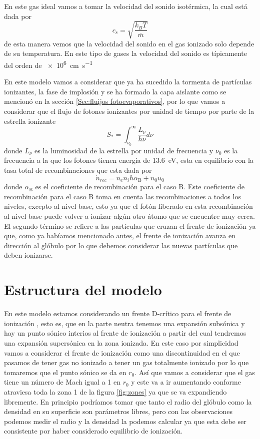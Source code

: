 \documentclass{book}
\begin{document}
En este gas ideal vamos a tomar la velocidad del sonido isotérmica, la cual está dada por
\[c_s  = \sqrt{\frac{k_B T}{\bar{m}}}\] de esta manera vemos que la velocidad del sonido en el gas ionizado solo depende de su temperatura. En este tipo de gases la velocidad del sonido es típicamente del orden de \SI{e6}{cm.s^{-1}}

En este modelo vamos a considerar que  ya ha sucedido la tormenta de partículas ionizantes, la fase de implosión y se ha formado la capa aislante como se mencionó en la sección \ref{Sec:fluijos fotoevaporativos}, por lo que vamos a considerar que el flujo de fotones ionizantes por unidad de tiempo por parte de la estrella ionizante 
\[S_* = \int_{\nu_0}^\infty \frac{L_\nu}{h\nu}d\nu\] donde $L_\nu$ es la luminosidad de la estrella por unidad de frecuencia y $\nu_0$ es la frecuencia a la que los fotones tienen energía de \SI{13.6}{eV}, esta en equilibrio con la tasa total de recombinaciones que esta dada por 
\[\dot{n}_{rec}=n_e n_i h \alpha_\mathrm{B}+n_0u_0\] donde $\alpha_\mathrm{B}$ es el coeficiente de recombinación para el caso B. Este coeficiente de recombinación para el caso B toma en cuenta las recombinaciones a todos los niveles, excepto al nivel base, esto ya que el fotón liberado en esta recombinación al nivel base puede volver a ionizar algún otro átomo que se encuentre muy cerca. El segundo término se refiere a las partículas que cruzan el frente de ionización ya que, como ya habíamos mencionado antes, el frente de ionización avanza en dirección al glóbulo por lo que debemos considerar las nuevas partículas que deben ionizarse. 

\section{Estructura del modelo}\label{Estructura}

En este modelo  estamos considerando un frente D-crítico para el frente de ionización \citep{Shuu:1992}, esto es, que en la parte neutra tenemos una expansión subsónica y hay un punto sónico interios al frente de ionización a partir del cual tendremos una expansión supersónica en la zona ionizada. En este caso por simplicidad vamos a considerar el frente de ionización como una discontinuidad en el que pasamos de tener gas no ionizado a tener un gas totalmente ionizado por lo que tomaremos que el punto sónico se da en $r_0$. Así que vamos a considerar que el gas tiene un número de Mach igual a 1 en $r_0$ y este va a ir aumentando conforme atraviesa toda la zona 1 de la figura \ref{fig:zones} ya que se va expandiendo libremente. En principio podríamos tomar que tanto el radio del glóbulo como la densidad en su superficie son parámetros libres, pero con las observaciones podemos medir el radio y la densidad la podemos calcular ya que esta debe ser consistente por haber considerado equilibrio de ionización.
\end{document}
